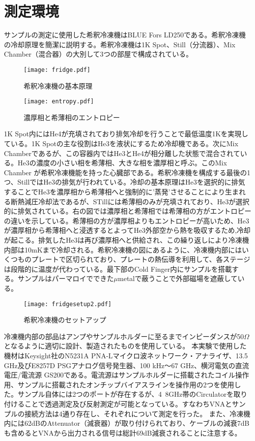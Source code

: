 \section{測定環境}
    サンプルの測定に使用した希釈冷凍機はBLUE Fors LD250である。希釈冷凍機の冷却原理を簡潔に説明する\cite*{fridge,fridge2}。希釈冷凍機は1K Spot、Still（分流器）、Mix Chamber（混合器）の大別して3つの部屋で構成されている。
    \begin{figure}[H]
        \begin{minipage}[t]{0.6\columnwidth}
            \centering
            \texttt{[image: fridge.pdf]}
            \caption{希釈冷凍機の基本原理}
        \end{minipage}%
        \begin{minipage}[t]{0.4\columnwidth}
            \centering
            \texttt{[image: entropy.pdf]}
            \caption{濃厚相と希薄相のエントロピー}
        \end{minipage}
    \end{figure}
    1K Spot内にはHe4が充填されており排気冷却を行うことで最低温度1Kを実現している。1K Spotの主な役割はHe3を液状にするため冷却機である。次にMix Chamberであるが、この容器内ではHe3とHe4が相分離した状態で混合されている。He3の濃度の小さい相を希薄相、大きな相を濃厚相と呼ぶ。このMix　Chamber が希釈冷凍機能を持った心臓部である。希釈冷凍機を構成する最後の1つ、StillではHe3の排気が行われている。冷却の基本原理はHe3を選択的に排気することでHe3を濃厚相から希薄相へと強制的に’蒸発’させることにより生まれる断熱減圧冷却法であるが、STillには希薄相のみが充填されており、He3が選択的に排気されている。右の図では濃厚相と希薄相では希薄相の方がエントロピーの違いを示している。希薄相の方が濃厚相よりもエントロピーが高いため、He3が濃厚相から希薄相へと浸透するとよってHe3外部空から熱を吸収するため,冷却が起こる。排気したHe3は再び濃厚相へと供給され、この繰り返しにより冷凍機内部は10mKまで冷却される。希釈冷凍機の図にあるように、冷凍機内部にはいくつものプレートで区切られており、プレートの熱伝導を利用して、各ステージは段階的に温度が代わっている。最下部のCold Finger内にサンプルを搭載する。サンプルはパーマロイでできた$\mu$metalで蔽うことで外部磁場を遮蔽している。
    \begin{figure}[H]
        \centering
        \texttt{[image: fridgesetup2.pdf]}
        \caption{希釈冷凍機のセットアップ}
    \end{figure}
    冷凍機内部の部品はアンプやサンプルホルダーに至るまでインピーダンスが50$\Omega$となるように適切に設計、製造されたものを使用している。
    本実験で使用した機材はKeysight社のN5231A PNA-Lマイクロ波ネットワーク・アナライザ、13.5 GHz及びE8257D PSGアナログ信号発生器、100 kHz～67 GHz、横河電気の直流電圧/電流源 GS200である。電流源はサンプルホルダーに搭載されたコイル操作用、サンプルに搭載されたオンチップバイアスラインを操作用の2つを使用した。サンプル自体には2つのポートが存在するが、4~8GHz帯のCirculatorを取り付けることで透過測定及び反射測定が可能となっている。すなわちVNAとサンプルの接続方法は4通り存在し、それぞれについて測定を行った。
    また、冷凍機内には62dBのAttenuator（減衰器）が取り付けられており、ケーブルの減衰7dBも含めるとVNAから出力される信号は総計69dB減衰されることに注意する。

